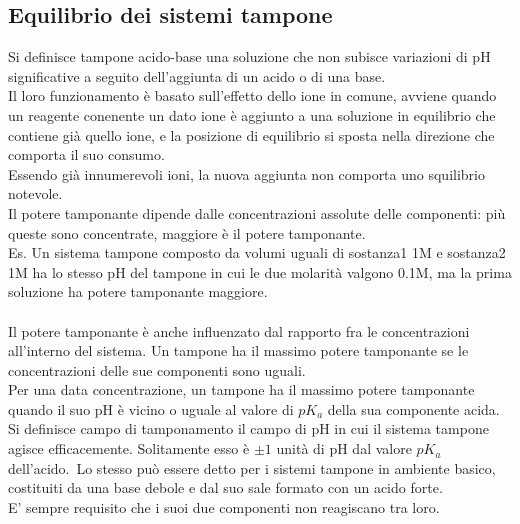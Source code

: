 \subsection{Equilibrio dei sistemi tampone}
Si definisce tampone acido-base una soluzione che non subisce variazioni di pH significative a seguito dell'aggiunta di un acido o di una base.\\
Il loro funzionamento è basato sull'effetto dello ione in comune, avviene quando un reagente conenente un dato ione è aggiunto a una soluzione in equilibrio che contiene già quello ione, e la posizione di equilibrio si sposta nella direzione che comporta il suo consumo.\\
Essendo già innumerevoli ioni, la nuova aggiunta non comporta uno squilibrio notevole.\\
Il potere tamponante dipende dalle concentrazioni assolute delle componenti: più queste sono concentrate, maggiore è il potere tamponante.\\ 
Es. Un sistema tampone composto da volumi uguali di sostanza1 1M e sostanza2 1M ha lo stesso pH del tampone in cui le due molarità valgono 0.1M, ma la prima soluzione ha potere tamponante maggiore.\\\\
Il potere tamponante è anche influenzato dal rapporto fra le concentrazioni all'interno del sistema. Un tampone ha il massimo potere tamponante se le concentrazioni delle sue componenti sono uguali.\\
Per una data concentrazione, un tampone ha il massimo potere tamponante quando il suo pH è vicino o uguale al valore di $pK_a$ della sua componente acida. Si definisce campo di tamponamento il campo di pH in cui il sistema tampone agisce efficacemente. Solitamente esso è $\pm 1$ unità di pH dal valore $pK_a$ dell'acido.\
Lo stesso può essere detto per i sistemi tampone in ambiente basico, costituiti da una base debole e dal suo sale formato con un acido forte. \\
E' sempre requisito che i suoi due componenti non reagiscano tra loro.
